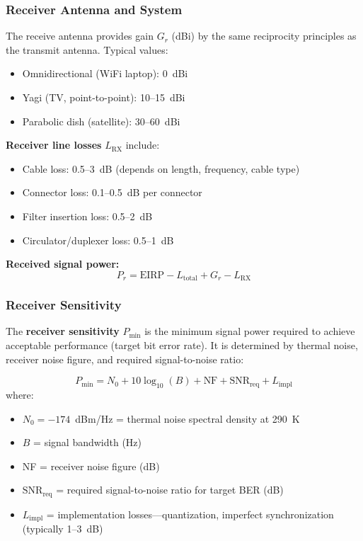 \subsubsection{Receiver Antenna and System}

The receive antenna provides gain $G_r$ (dBi) by the same reciprocity principles as the transmit antenna. Typical values:
\begin{itemize}
\item Omnidirectional (WiFi laptop): 0~dBi
\item Yagi (TV, point-to-point): 10--15~dBi
\item Parabolic dish (satellite): 30--60~dBi
\end{itemize}

\textbf{Receiver line losses} $L_{\text{RX}}$ include:
\begin{itemize}
\item Cable loss: 0.5--3~dB (depends on length, frequency, cable type)
\item Connector loss: 0.1--0.5~dB per connector
\item Filter insertion loss: 0.5--2~dB
\item Circulator/duplexer loss: 0.5--1~dB
\end{itemize}

\textbf{Received signal power:}
\begin{equation}
\label{eq:received_power}
P_r = \text{EIRP} - L_{\text{total}} + G_r - L_{\text{RX}}
\end{equation}

\subsubsection{Receiver Sensitivity}

The \textbf{receiver sensitivity} $P_{\text{min}}$ is the minimum signal power required to achieve acceptable performance (target bit error rate). It is determined by thermal noise, receiver noise figure, and required signal-to-noise ratio:

\begin{equation}
\label{eq:sensitivity}
P_{\text{min}} = N_0 + 10\log_{10}(B) + \text{NF} + \text{SNR}_{\text{req}} + L_{\text{impl}}
\end{equation}
where:
\begin{itemize}
\item $N_0 = -174$~dBm/Hz = thermal noise spectral density at 290~K
\item $B$ = signal bandwidth (Hz)
\item NF = receiver noise figure (dB)
\item $\text{SNR}_{\text{req}}$ = required signal-to-noise ratio for target BER (dB)
\item $L_{\text{impl}}$ = implementation losses---quantization, imperfect synchronization (typically 1--3~dB)
\end{itemize}

